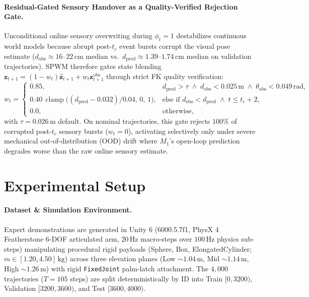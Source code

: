 \documentclass[11pt]{article}
\begin{document}
\paragraph{Residual-Gated Sensory Handover as a Quality-Verified Rejection Gate.} Unconditional online sensory overwriting during $\phi_t = 1$ destabilizes continuous world models because abrupt post-$t_c$ event bursts corrupt the visual pose estimate ($d_{\text{obs}} \approx 16\text{--}22\,\text{cm}$ median vs.\ $d_{\text{pred}} \approx 1.39\text{--}1.74\,\text{cm}$ median on validation trajectories). SPWM therefore gates state blending $\mathbf{z}_{t+1} = (1 - w_t)\hat{\mathbf{z}}_{t+1} + w_t\mathbf{z}^{\text{obs}}_{t+1}$ through strict FK quality verification:
\[
w_t = \begin{cases} 0.85, & d_{\text{pred}} > \tau \;\wedge\; d_{\text{obs}} < 0.025\,\text{m} \;\wedge\; \theta_{\text{obs}} < 0.049\,\text{rad}, \\ 0.40\,\operatorname{clamp}\!\big((d_{\text{pred}} - 0.032)/0.04,\, 0,\, 1\big), & \text{else if } d_{\text{obs}} < d_{\text{pred}} \;\wedge\; t \le t_c + 2, \\ 0.0, & \text{otherwise}, \end{cases}
\]
with $\tau = 0.026\,\text{m}$ default. On nominal trajectories, this gate rejects $100\%$ of corrupted post-$t_c$ sensory bursts ($w_t = 0$), activating selectively only under severe mechanical out-of-distribution (OOD) drift where $M_1$'s open-loop prediction degrades worse than the raw online sensory estimate.

\section{Experimental Setup}

\paragraph{Dataset \& Simulation Environment.} Expert demonstrations are generated in Unity 6 (6000.5.7f1, PhysX 4 Featherstone 6-DOF articulated arm, $20\,\text{Hz}$ macro-steps over $100\,\text{Hz}$ physics sub-steps) manipulating procedural rigid payloads (Sphere, Box, ElongatedCylinder; $m \in [1.20, 4.50]\,\text{kg}$) across three elevation planes (Low $\sim 1.04\,\text{m}$, Mid $\sim 1.14\,\text{m}$, High $\sim 1.26\,\text{m}$) with rigid \texttt{FixedJoint} palm-latch attachment. The $4{,}000$ trajectories ($T=105$ steps) are split deterministically by ID into Train $[0, 3200)$, Validation $[3200, 3600)$, and Test $[3600, 4000)$.
\end{document}
